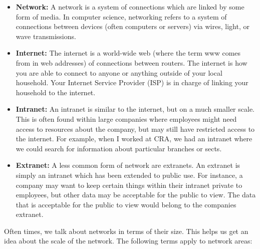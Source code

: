 \documentclass{article}
\begin{document}
\begin{itemize}

\item{%
    \textbf{Network:} A network is a system of connections which are linked by some form of media. In computer
    science, networking refers to a system of connections between devices (often computers or servers) via
    wires, light, or wave transmissions.
}

\item{%
    \textbf{Internet:} The internet is a world-wide web (where the term www comes from in web addresses) of
    connections between routers. The internet is how you are able to connect to anyone or anything outside of
    your local household. Your Internet Service Provider (ISP) is in charge of linking your household to the
    internet.
}

\item{%
    \textbf{Intranet:} An intranet is similar to the internet, but on a much smaller scale. This is often
    found within large companies where employees might need access to resources about the company, but may
    still have restricted access to the internet. For example, when I worked at CRA, we had an intranet where
    we could search for information about particular branches or sects.
}

\item{%
    \textbf{Extranet:} A less common form of network are extranets. An extranet is simply an intranet which
    has been extended to public use. For instance, a company may want to keep certain things within their
    intranet private to employees, but other data may be acceptable for the public to view. The data that is
    acceptable for the public to view would belong to the companies extranet.
}

\end{itemize}

Often times, we talk about networks in terms of their size. This helps us get an idea about the scale of the
network. The following terms apply to network areas:
\end{document}

